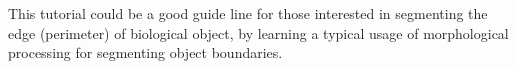 This tutorial could be a good guide line for those interested in segmenting the edge (perimeter) of biological object, by learning a typical usage of morphological processing for segmenting object boundaries.